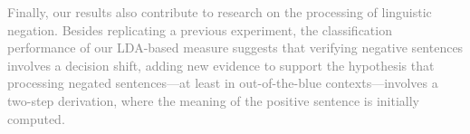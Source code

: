 \documentclass[draft]{article}
\newcommand{\changeEC}[2]{{\footnotesize\textcolor{gray}{#1}}\textcolor{blue}{#2}}
\begin{document}

\changeEC{Finally, our results also contribute to research on the processing of linguistic negation. Besides replicating a previous experiment, the classification performance of our LDA-based measure suggests that verifying negative sentences involves a decision shift, adding new evidence to support the hypothesis that processing negated sentences---at least in out-of-the-blue contexts---involves a two-step derivation, where the meaning of the positive sentence is initially computed.  }{}

%
    
    

\end{document}
